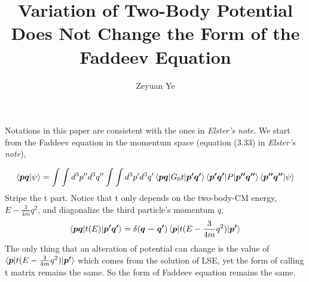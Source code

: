 \documentclass[11pt]{article}
\date{}
\title{Variation of Two-Body Potential Does Not Change the Form of the Faddeev Equation}
\author[1]{Zeyuan Ye}
\begin{document}
  \maketitle

  Notations in this paper are consistent with the ones in \textit{Elster's
    note}. We start from the Faddeev equation in the momentum space (equation
  (3.33) in \textit{Elster's note}),

  \begin{equation}
    \braket{\boldsymbol{p q}| \psi} = \int{\int{d^3p'' d^3q''}} \int{\int{d^3p' d^3q'}} \braket{\boldsymbol{pq}|G_0t|\boldsymbol{p'q'}} \braket{\boldsymbol{p'q'}|P|\boldsymbol{p''q''}} \braket{\boldsymbol{p'' q''}|\psi}
  \end{equation}
  Stripe the t part. Notice that t only depends on the two-body-CM energy, $E
  - \frac{3}{4m}q^2$, and diagonalize the third particle's momentum $q$,
  \begin{equation}
    \braket{\boldsymbol{pq}|t(E)|\boldsymbol{p'q'}} = \delta(\boldsymbol{q - q'}) \braket{\boldsymbol{p}|t(E - \frac{3}{4m}q^2)|\boldsymbol{p'}}
    \end{equation}
    The only thing that an alteration of potential can change is the value of
    $\braket{\boldsymbol{p}|t(E - \frac{3}{4m}q^2)|\boldsymbol{p'}}$ which comes
    from the solution of LSE, yet the form of calling t matrix remains the same.
    So the form of Faddeev equation remains the same.
\end{document}
